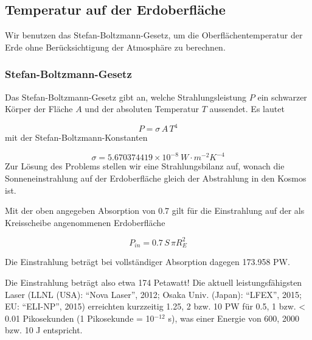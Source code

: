 \documentclass[
  a4paper,
  DIV=11]{scrreprt}
\newenvironment{Shaded}{\begin{snugshade}}{\end{snugshade}}
\newcommand{\ConstantTok}[1]{\textcolor[rgb]{0.56,0.35,0.01}{#1}}
\newcommand{\FloatTok}[1]{\textcolor[rgb]{0.68,0.00,0.00}{#1}}
\newcommand{\FunctionTok}[1]{\textcolor[rgb]{0.28,0.35,0.67}{#1}}
\newcommand{\NormalTok}[1]{\textcolor[rgb]{0.00,0.23,0.31}{#1}}
\newcommand{\OperatorTok}[1]{\textcolor[rgb]{0.37,0.37,0.37}{#1}}
\newcommand{\SpecialCharTok}[1]{\textcolor[rgb]{0.37,0.37,0.37}{#1}}
\newcommand{\StringTok}[1]{\textcolor[rgb]{0.13,0.47,0.30}{#1}}
\begin{document}
\hypertarget{temperatur-auf-der-erdoberfluxe4che}{%
\subsection{Temperatur auf der
Erdoberfläche}\label{temperatur-auf-der-erdoberfluxe4che}}

Wir benutzen das Stefan-Boltzmann-Gesetz, um die Oberflächentemperatur
der Erde ohne Berücksichtigung der Atmosphäre zu berechnen.

\hypertarget{stefan-boltzmann-gesetz}{%
\subsubsection{Stefan-Boltzmann-Gesetz}\label{stefan-boltzmann-gesetz}}

Das Stefan-Boltzmann-Gesetz gibt an, welche Strahlungsleistung \(P\) ein
schwarzer Körper der Fläche \(A\) und der absoluten Temperatur \(T\)
aussendet. Es lautet

\[
P = \sigma\, A \, T^4
\] mit der Stefan-Boltzmann-Konstanten

\[
\sigma = 5.670374419 \times 10^{-8}~W\cdot m^{-2} K^{-4}
\] Zur Lösung des Problems stellen wir eine Strahlungsbilanz auf, wonach
die Sonneneinstrahlung auf der Erdoberfläche gleich der Abstrahlung in
den Kosmos ist.

Mit der oben angegeben Absorption von 0.7 gilt für die Einstrahlung auf
der als Kreisscheibe angenommenen Erdoberfläche

\[
P_{in} = 0.7 \, S \, \pi R_E^2
\]

\begin{Shaded}
\end{Shaded}

Die Einstrahlung beträgt bei vollständiger Absorption dagegen 173.958
PW.

Die Einstrahlung beträgt also etwa 174 Petawatt! Die aktuell
leistungsfähigsten Laser (LLNL (USA): ``Nova Laser'', 2012; Osaka Univ.
(Japan): ``LFEX'', 2015; EU: ``ELI-NP'', 2015) erreichten kurzzeitig
1.25, 2 bzw. 10 PW für 0.5, 1 bzw. \textless{} 0.01 Pikosekunden (1
Pikosekunde = 10\(^{-12}\) s), was einer Energie von 600, 2000 bzw. 10 J
entspricht.
\end{document}
